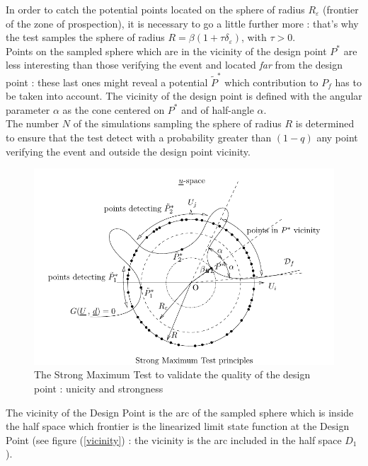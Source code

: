 In order to catch the potential points located on the sphere of radius $R_{\varepsilon}$ (frontier of the zone of prospection), it is necessary to go a little further more : that's why the test samples the sphere of radius  $R = \beta(1+\tau \delta_{\varepsilon})$, with $\tau >0$.\\

Points on the sampled sphere which are in the vicinity of the design point $P^*$ are less interesting than those verifying the event and located {\itshape far} from the design point : these last ones might reveal a potential $\tilde{P}^*$ which contribution to $P_f$ has to be taken into account. The  vicinity of the design point is defined with the angular parameter $\alpha$ as the cone centered on $P^*$ and of half-angle $\alpha$.\\

The number $N$ of the simulations sampling the sphere of radius $R$ is determined  to ensure that the test detect with a probability greater than $(1 - q)$ any point verifying the event and outside the design point vicinity. \\

\begin{figure}[H]
  \begin{center}
    \includegraphics[scale=0.85]{FigureStrongMaxTest.pdf}
    \caption{The Strong Maximum Test to validate the quality of the design point : unicity and strongness}
    \label{SMT}
  \end{center}
\end{figure}

The vicinity of the Design Point  is the arc of the sampled sphere which is inside the half space which frontier is the linearized limit state function at the Design Point (see figure (\ref{vicinity}) : the vicinity is the arc included in the half space $D_1$).\\

